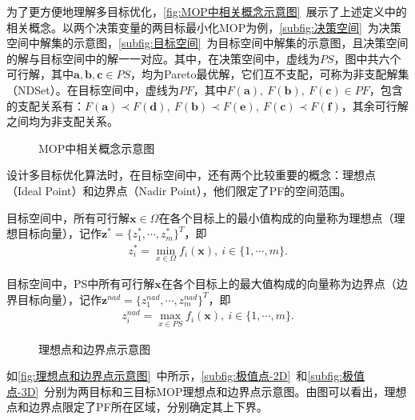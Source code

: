 为了更方便地理解多目标优化，\autoref{fig:MOP中相关概念示意图}~展示了上述定义中的相关概念。以两个决策变量的两目标最小化MOP为例，\autoref{subfig:决策空间}~为决策空间中解集的示意图，\autoref{subfig:目标空间}~为目标空间中解集的示意图，且决策空间的解与目标空间中的解一一对应。其中，在决策空间中，虚线为$PS$，图中共六个可行解，其中$\mathbf{a}, \mathbf{b}, \mathbf{c} \in PS$，均为Pareto最优解，它们互不支配，可称为非支配解集（NDSet）。在目标空间中，虚线为$PF$，其中$F(\mathbf{a}), \ F(\mathbf{b}), \ F(\mathbf{c}) \in PF$，包含的支配关系有：$F(\mathbf{a}) \prec F(\mathbf{d}), \ F(\mathbf{b}) \prec F(\mathbf{e}), \ F(\mathbf{c}) \prec F(\mathbf{f})$，其余可行解之间均为非支配关系。
\begin{figure}[htb]
    \caption{MOP中相关概念示意图}
    \label{fig:MOP中相关概念示意图}
\end{figure}
\par
设计多目标优化算法时，在目标空间中，还有两个比较重要的概念：理想点（Ideal Point）和边界点（Nadir Point），他们限定了PF的空间范围。
\par
\begin{definition}
    \label{def:理想点}
    目标空间中，所有可行解$\mathbf{x} \in \Omega$在各个目标上的最小值构成的向量称为理想点（理想目标向量），记作$\mathbf{z}^* = \{ z_1^*, \cdots, z_m^* \}^T$，即
    \begin{align}
        \label{eq:理想点}
        z_i^* = \min_{x \in \Omega} f_i(\mathbf{x}), \ i \in \{ 1, \cdots, m \}.
    \end{align}
\end{definition}
\par
\begin{definition}
    \label{def:边界点}
    目标空间中，PS中所有可行解$\mathbf{x}$在各个目标上的最大值构成的向量称为边界点（边界目标向量），记作$\mathbf{z}^{nad} = \{ z_1^{nad}, \cdots, z_m^{nad} \}^T$，即
    \begin{align}
        \label{eq:边界点}
        z_i^{nad} = \max_{x \in PS} f_i(\mathbf{x}), \ i \in \{ 1, \cdots, m \}.
    \end{align}
\end{definition}
\par
\begin{figure}[htb]
    \caption{理想点和边界点示意图}
    \label{fig:理想点和边界点示意图}
\end{figure}
\par
如\autoref{fig:理想点和边界点示意图}~中所示，\autoref{subfig:极值点-2D}~和\autoref{subfig:极值点-3D}~分别为两目标和三目标MOP理想点和边界点示意图。由图可以看出，理想点和边界点限定了PF所在区域，分别确定其上下界。


